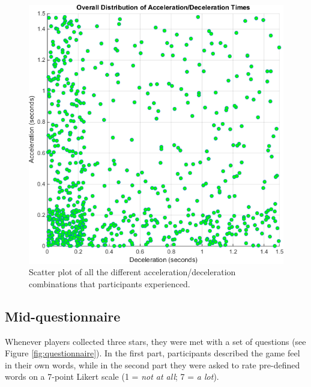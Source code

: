\begin{figure}[htbp]
\centering
\includegraphics[width=0.7\columnwidth]{Pics/Classes/overall_distribution}
\caption{Scatter plot of all the different acceleration/deceleration combinations that participants experienced.}
\label{fig:overallDistribution}
\end{figure}

\subsection{Mid-questionnaire}
Whenever players collected three stars, they were met with a set of questions (see Figure \ref{fig:questionnaire}). In the first part, participants described the game feel in their own words, while in the second part they were asked to rate pre-defined words on a 7-point Likert scale (1 = \textit{not at all}; 7 = \textit{a lot}).

